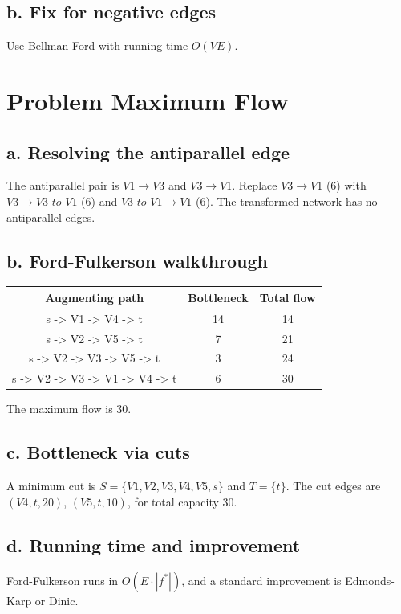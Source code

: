 \documentclass[11pt]{article}
\begin{document}
\subsection*{b. Fix for negative edges}
Use Bellman-Ford with running time \( O(VE) \).
\section{Problem Maximum Flow}
\subsection*{a. Resolving the antiparallel edge}
The antiparallel pair is \(V1 \rightarrow V3\) and \(V3 \rightarrow V1\).
Replace \(V3 \rightarrow V1\) (6) with \(V3 \rightarrow V3\_to\_V1\) (6) and \(V3\_to\_V1 \rightarrow V1\) (6).
The transformed network has no antiparallel edges.
\subsection*{b. Ford-Fulkerson walkthrough}
\begin{tabular}{|c|c|c|}
\hline
Augmenting path & Bottleneck & Total flow \\
\hline
s -> V1 -> V4 -> t & 14 & 14 \\
s -> V2 -> V5 -> t & 7 & 21 \\
s -> V2 -> V3 -> V5 -> t & 3 & 24 \\
s -> V2 -> V3 -> V1 -> V4 -> t & 6 & 30 \\
\hline
\end{tabular}
The maximum flow is \( 30 \).
\subsection*{c. Bottleneck via cuts}
A minimum cut is \(S = \{V1, V2, V3, V4, V5, s\}\) and \(T = \{t\}\).
The cut edges are \((V4, t, 20)\), \((V5, t, 10)\), for total capacity \( 30 \).
\subsection*{d. Running time and improvement}
Ford-Fulkerson runs in \( O(E \cdot |f^\ast|) \), and a standard improvement is Edmonds-Karp or Dinic.
\end{document}
